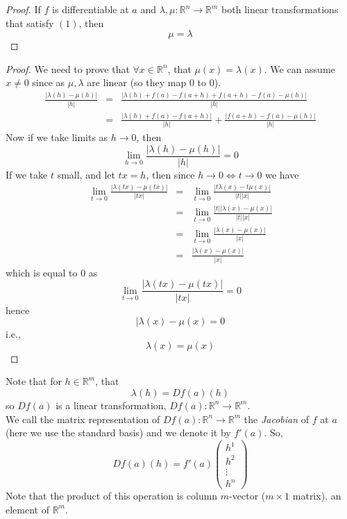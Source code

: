 \documentclass[a4paper,14pt]{extarticle}
\theoremstyle{definition}
\begin{document}
\begin{proof}
	If $f$ is differentiable at $a$ and $\lambda,\mu:\mathbb{R}^n\rightarrow\mathbb{R}^m$ both linear transformations that satisfy $(1)$, then \[\mu=\lambda\]
\end{proof}

\begin{proof}
	We need to prove that $\forall x\in\mathbb{R}^n$, that $\mu(x)=\lambda(x)$. We can assume $x\neq0$ since as $\mu,\lambda$ are linear (so they map $0$ to $0$). 
	\begin{eqnarray*}
		\frac{|\lambda(h)-\mu(h)|}{|h|}&=&\frac{|\lambda(h)+f(a)-f(a+h)+f(a+h)-f(a)-\mu(h)|}{|h|} \\
			&=&\frac{|\lambda(h)+f(a)-f(a+h)|}{|h|}+\frac{|f(a+h)-f(a)-\mu(h)|}{|h|}
	\end{eqnarray*}
	Now if we take limits as $h\to0$, then \[\lim\limits_{h\to0}\frac{|\lambda(h)-\mu(h)|}{|h|}=0\] If we take $t$ small, and let $tx=h$, then since $h\to0\iff t\to0$ we have
	\begin{eqnarray*}
		\lim\limits_{t\to0}\frac{|\lambda(tx)-\mu(tx)|}{|tx|}&=&\lim\limits_{t\to0}\frac{|t\lambda(x)-t\mu(x)|}{|t||x|}\\
				&=&\lim\limits_{t\to0}\frac{|t||\lambda(x)-\mu(x)|}{|t||x|}\\
				&=&\lim\limits_{t\to0}\frac{|\lambda(x)-\mu(x)|}{|x|}\\
				&=&\frac{|\lambda(x)-\mu(x)|}{|x|}
	\end{eqnarray*}
	which is equal to 0 as \[\lim\limits_{t\to0}\frac{|\lambda(tx)-\mu(tx)|}{|tx|}=0\] hence \[|\lambda(x)-\mu(x)=0\] i.e., \[\lambda(x)=\mu(x)\]
\end{proof}

Note that for $h\in\mathbb{R}^m$, that \[\lambda(h)=Df(a)(h)\] so $Df(a)$ is a linear transformation, $Df(a):\mathbb{R}^n\rightarrow\mathbb{R}^m$. \\

We call the matrix representation of $Df(a):\mathbb{R}^n\rightarrow\mathbb{R}^m$ the \emph{Jacobian} of $f$ at $a$ (here we use the standard basis) and we denote it by
$f'(a)$. So, \[Df(a)(h)=f'(a)\begin{pmatrix}h^1\\h^2\\\vdots\\h^n\end{pmatrix}\] Note that the product of this operation is column $m$-vector ($m\times1$ matrix), an element of
$\mathbb{R}^m$.
\end{document}

